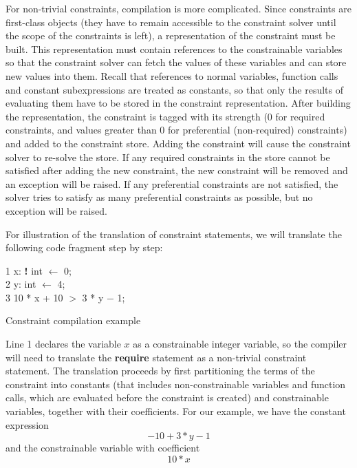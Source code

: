 For non-trivial constraints, compilation is more complicated.  Since
constraints are first-class objects (they have to remain accessible to
the constraint solver until the scope of the constraints is left), a
representation of the constraint must be built.  This representation
must contain references to the constrainable variables so that the
constraint solver can fetch the values of these variables and can
store new values into them.  Recall that references to normal
variables, function calls and constant subexpressions are treated as
constants, so that only the results of evaluating them have to be
stored in the constraint representation.  After building the
representation, the constraint is tagged with its strength (0 for
required constraints, and values greater than 0 for preferential
(non-required) constraints) and added to the constraint store.  Adding
the constraint will cause the constraint solver to re-solve the store.
If any required constraints in the store cannot be satisfied after
adding the new constraint, the new constraint will be removed and an
exception will be raised.  If any preferential constraints are not
satisfied, the solver tries to satisfy as many preferential
constraints as possible, but no exception will be raised.

For illustration of the translation of constraint statements, we will
translate the following code fragment step by step:

\begin{Program}
\begin{ttlprog}
1\>\ttlVar{} x: {\bf!} int $\leftarrow$ \ttlVar{} 0;\\
2\>\ttlVar{} y: int $\leftarrow$ 4;\\
3\>\ttlRequire{} 10 * x + 10 $>$ 3 * y $-$ 1;
\end{ttlprog}
\caption{Constraint compilation example}
\label{prog:constraint-compilation-example}
\end{Program}

Line 1 declares the variable $x$ as a constrainable integer variable,
so the compiler will need to translate the {\bf require} statement as
a non-trivial constraint statement.  The translation proceeds by first
partitioning the terms of the constraint into constants (that includes
non-constrainable variables and function calls, which are evaluated
before the constraint is created) and constrainable variables,
together with their coefficients.  For our example, we have the
constant expression 
$$ -10+3*y - 1$$
and the constrainable variable with coefficient
$$10*x$$

